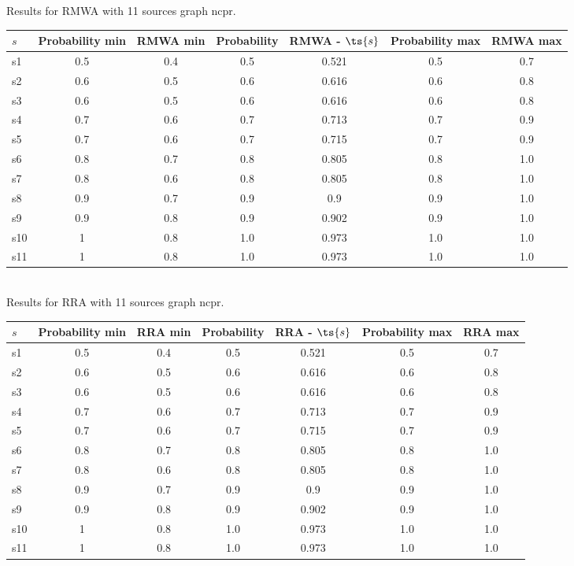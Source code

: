 \documentclass{article}
\begin{document}
\noindent Results for RMWA with 11 sources graph ncpr.

\noindent\begin{tabular}{|l|c|c|c|c|c|c|}
\hline
$s$& Probability min & RMWA min & Probability & RMWA - $\ts{s}$ & Probability max & RMWA max\\
\hline
s1 &0.5 & 0.4 & 0.5 & 0.521 & 0.5 & 0.7\\
\hline
s2 &0.6 & 0.5 & 0.6 & 0.616 & 0.6 & 0.8\\
\hline
s3 &0.6 & 0.5 & 0.6 & 0.616 & 0.6 & 0.8\\
\hline
s4 &0.7 & 0.6 & 0.7 & 0.713 & 0.7 & 0.9\\
\hline
s5 &0.7 & 0.6 & 0.7 & 0.715 & 0.7 & 0.9\\
\hline
s6 &0.8 & 0.7 & 0.8 & 0.805 & 0.8 & 1.0\\
\hline
s7 &0.8 & 0.6 & 0.8 & 0.805 & 0.8 & 1.0\\
\hline
s8 &0.9 & 0.7 & 0.9 & 0.9 & 0.9 & 1.0\\
\hline
s9 &0.9 & 0.8 & 0.9 & 0.902 & 0.9 & 1.0\\
\hline
s10 &1 & 0.8 & 1.0 & 0.973 & 1.0 & 1.0\\
\hline
s11 &1 & 0.8 & 1.0 & 0.973 & 1.0 & 1.0\\
\hline
\end{tabular}\\

\noindent Results for RRA with 11 sources graph ncpr.

\noindent\begin{tabular}{|l|c|c|c|c|c|c|}
\hline
$s$& Probability min & RRA min & Probability & RRA - $\ts{s}$ & Probability max & RRA max\\
\hline
s1 &0.5 & 0.4 & 0.5 & 0.521 & 0.5 & 0.7\\
\hline
s2 &0.6 & 0.5 & 0.6 & 0.616 & 0.6 & 0.8\\
\hline
s3 &0.6 & 0.5 & 0.6 & 0.616 & 0.6 & 0.8\\
\hline
s4 &0.7 & 0.6 & 0.7 & 0.713 & 0.7 & 0.9\\
\hline
s5 &0.7 & 0.6 & 0.7 & 0.715 & 0.7 & 0.9\\
\hline
s6 &0.8 & 0.7 & 0.8 & 0.805 & 0.8 & 1.0\\
\hline
s7 &0.8 & 0.6 & 0.8 & 0.805 & 0.8 & 1.0\\
\hline
s8 &0.9 & 0.7 & 0.9 & 0.9 & 0.9 & 1.0\\
\hline
s9 &0.9 & 0.8 & 0.9 & 0.902 & 0.9 & 1.0\\
\hline
s10 &1 & 0.8 & 1.0 & 0.973 & 1.0 & 1.0\\
\hline
s11 &1 & 0.8 & 1.0 & 0.973 & 1.0 & 1.0\\
\hline
\end{tabular}\\
\end{document}
